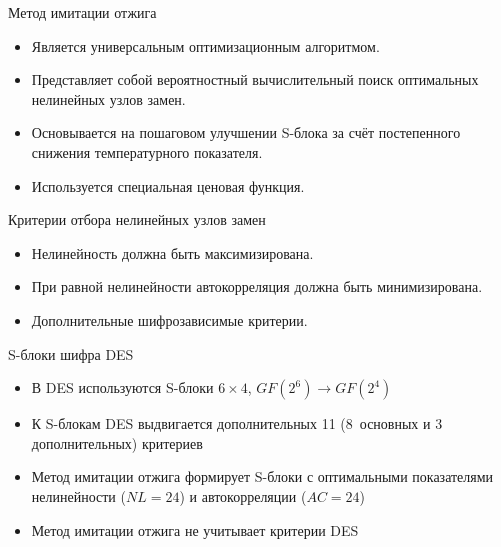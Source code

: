\documentclass[12pt,unicode]{beamer}
\begin{document}
\begin{frame}{Метод имитации отжига}

    \begin{itemize}

        \item Является универсальным оптимизационным алгоритмом.

        \item Представляет собой вероятностный вычислительный поиск оптимальных нелинейных узлов замен.

        \item Основывается на пошаговом улучшении S-блока за счёт постепенного
        снижения температурного показателя.

        \item Используется специальная ценовая функция.

    \end{itemize}

\end{frame}


\begin{frame}{Критерии отбора нелинейных узлов замен}

    \begin{itemize}

        \item Нелинейность должна быть максимизирована.

        \item При равной нелинейности автокорреляция должна быть минимизирована.

        \item Дополнительные шифрозависимые критерии.

    \end{itemize}

\end{frame}


\begin{frame}{S-блоки шифра DES}

    \begin{itemize}
        
        \item В DES используются S-блоки $6 \times 4$, $GF(2^6) \rightarrow GF(2^4)$

        \item К S-блокам DES выдвигается дополнительных 11 (8~основных и 3 дополнительных) критериев

        \item Метод имитации отжига формирует S-блоки с оптимальными показателями нелинейности ($NL = 24$) и автокорреляции ($AC = 24$)
        
        \item Метод имитации отжига не учитывает критерии DES

    \end{itemize}

\end{frame}
\end{document}
